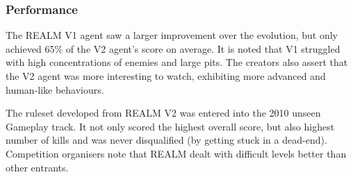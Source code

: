 \subsubsection*{\hspace{6pt}Performance}

The REALM V1 agent saw a larger improvement over the evolution, but only achieved 65\% of the V2 agent's score on average. It is noted that V1 struggled with high concentrations of enemies and large pits. The creators also assert that the V2 agent was more interesting to watch, exhibiting more advanced and human-like behaviours. \cite[pp.~89-90]{realm}

The ruleset developed from REALM V2 was entered into the 2010 unseen Gameplay track. It not only scored the highest overall score, but also highest number of kills and was never disqualified (by getting stuck in a dead-end). Competition organisers note that REALM dealt with difficult levels better than other entrants. \cite[p.~10]{2012the}



